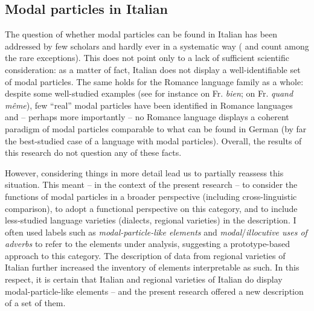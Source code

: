 \subsection{Modal particles in Italian}
\hypertarget{Toc124860696}{}
The question of whether modal particles can be found in Italian has been addressed by few scholars and hardly ever in a systematic way (\citealt{Coniglio2008} and \citealt{Squartini2017} count among the rare exceptions). This does not point only to a lack of sufficient scientific consideration: as a matter of fact, Italian does not display a well-identifiable set of modal particles. The same holds for the Romance language family as a whole: despite some well-studied examples (see for instance \citealt{Hansen1998b} on Fr. \textit{bien}; \citealt{Waltereit2004,Waltereit2020} on Fr. \textit{quand même}), few “real” modal particles have been identified in Romance languages and – perhaps more importantly – no Romance language displays a coherent paradigm of modal particles comparable to what can be found in German (by far the best-studied case of a language with modal particles). Overall, the results of this research do not question any of these facts.

However, considering things in more detail lead us to partially reassess this situation. This meant – in the context of the present research – to consider the functions of modal particles in a broader perspective (including cross-linguistic comparison), to adopt a functional perspective on this category, and to include less-studied language varieties (dialects, regional varieties) in the description. I often used labels such as \textit{modal-particle-like elements} and \textit{modal}/\textit{illocutive uses of adverbs} to refer to the elements under analysis, suggesting a prototype-based approach to this category. The description of data from regional varieties of Italian further increased the inventory of elements interpretable as such. In this respect, it is certain that Italian and regional varieties of Italian do display modal-particle-like elements – and the present research offered a new description of a set of them.


